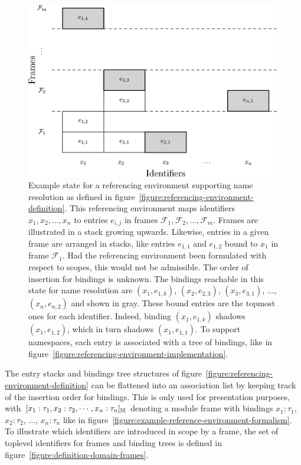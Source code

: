 \begin{figure}
\centering
\includegraphics{figures/referencing-environment-name-resolution.eps}
\caption[Example state for a referencing environment]{%
Example state for a referencing environment supporting name resolution as defined in figure~\ref{figure:referencing-environment-definition}.
This referencing environment maps identifiers $x_1, x_2, \dots, x_n$ to entries $e_{i,j}$ in frames $\mathcal{F}_1, \mathcal{F}_2, \dots, \mathcal{F}_m$.
Frames are illustrated in a stack growing upwards.
Likewise, entries in a given frame are arranged in stacks, like entries $e_{1,1}$ and $e_{1,2}$ bound to $x_1$ in frame $\mathcal{F}_1$.
Had the referencing environment been formulated with respect to scopes, this would not be admissible.
The order of insertion for bindings is unknown.
The bindings reachable in this state for name resolution are $(x_1, e_{1, k})$, $(x_2, e_{2, 3})$, $(x_3, e_{3, 1})$, $\dots$, $(x_n, e_{n, 2})$ and shown in gray.
These bound entries are the topmost ones for each identifier.
Indeed, binding $(x_1, e_{1,k})$ shadows $(x_1, e_{1,2})$, which in turn shadows $(x_1, e_{1,1})$.
To support namespaces, each entry is associated with a tree of bindings, like in figure~\ref{figure:referencing-environment-implementation}.
}
\label{figure:referencing-environment-name-resolution}
\end{figure}

The entry stacks and bindings tree structures of figure~\ref{figure:referencing-environment-definition} can be flattened into an association list by keeping track of the insertion order for bindings.
This is only used for presentation purposes, with $[x_1 : \tau_1, x_2 : \tau_2, \cdots, x_n : \tau_n]_{\mathbb{M}}$ denoting a module frame with bindings $x_1 : \tau_1$, $x_2 : \tau_2$, ..., $x_n : \tau_n$ like in figure~\ref{figure:example-reference-environment-formalism}.
To illustrate which identifiers are introduced in scope by a frame, the set of toplevel identifiers for frames and binding trees is defined in figure~\ref{figure:definition-domain-frames}.

